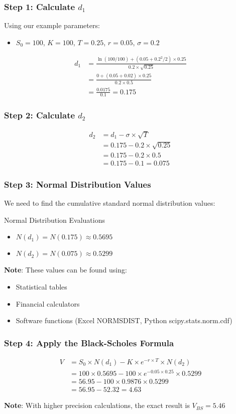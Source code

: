 \documentclass[aspectratio=169]{beamer}
\begin{document}
\begin{frame}
\frametitle{Step 1: Calculate $d_1$}
Using our example parameters:
\begin{itemize}
\item $S_0 = 100$, $K = 100$, $T = 0.25$, $r = 0.05$, $\sigma = 0.2$
\end{itemize}

\begin{align}
d_1 &= \frac{\ln(100/100) + (0.05 + 0.2^2/2) \times 0.25}{0.2 \times \sqrt{0.25}} \\
&= \frac{0 + (0.05 + 0.02) \times 0.25}{0.2 \times 0.5} \\
&= \frac{0.0175}{0.1} = 0.175
\end{align}
\end{frame}

\begin{frame}
\frametitle{Step 2: Calculate $d_2$}
\begin{align}
d_2 &= d_1 - \sigma \times \sqrt{T} \\
&= 0.175 - 0.2 \times \sqrt{0.25} \\
&= 0.175 - 0.2 \times 0.5 \\
&= 0.175 - 0.1 = 0.075
\end{align}
\end{frame}

\begin{frame}
\frametitle{Step 3: Normal Distribution Values}
We need to find the cumulative standard normal distribution values:

\begin{block}{Normal Distribution Evaluations}
\begin{itemize}
\item $N(d_1) = N(0.175) \approx 0.5695$
\item $N(d_2) = N(0.075) \approx 0.5299$
\end{itemize}
\end{block}

\textbf{Note}: These values can be found using:
\begin{itemize}
\item Statistical tables
\item Financial calculators
\item Software functions (Excel NORMSDIST, Python scipy.stats.norm.cdf)
\end{itemize}
\end{frame}

\begin{frame}
\frametitle{Step 4: Apply the Black-Scholes Formula}
\begin{align}
V &= S_0 \times N(d_1) - K \times e^{-r \times T} \times N(d_2) \\
&= 100 \times 0.5695 - 100 \times e^{-0.05 \times 0.25} \times 0.5299 \\
&= 56.95 - 100 \times 0.9876 \times 0.5299 \\
&= 56.95 - 52.32 = 4.63
\end{align}

\textbf{Note}: With higher precision calculations, the exact result is $V_{BS} = 5.46$
\end{frame}
\end{document}

